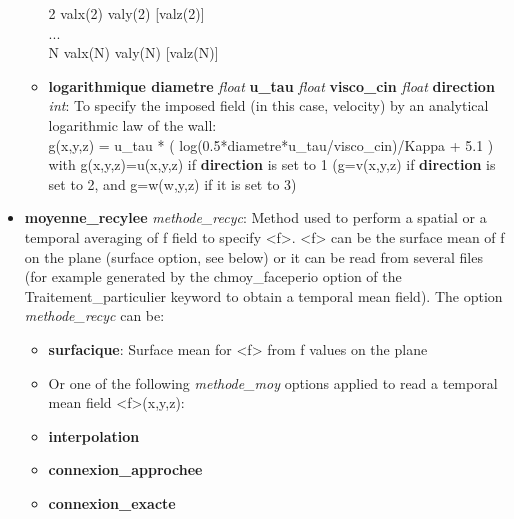 \begin{itemize}
\begin{itemize}
\begin{center}
    \hspace{-0.3cm} 2 valx(2) valy(2) [valz(2)] \\
    \hspace{-3.6cm} ... \\
    N valx(N) valy(N) [valz(N)] 
\end{center}
%
\item[] \textbf{logarithmique diametre} \textit{float} \textbf{u\_tau} \textit{float} \textbf{visco\_cin} \textit{float} \textbf{direction} \textit{int}: To specify the imposed field (in this case, velocity) by an analytical logarithmic law of the wall: \\
%
g(x,y,z) = u\_tau * ( log(0.5*diametre*u\_tau/visco\_cin)/Kappa + 5.1 ) \\
%
with g(x,y,z)=u(x,y,z) if \textbf{direction} is set to 1 (g=v(x,y,z) if \textbf{direction} is set to 2, and g=w(w,y,z) if it is set to 3)
%    
\end{itemize}
%
\item \textbf{moyenne\_recylee} \textit{methode\_recyc}: Method used to perform a spatial or a temporal averaging of f field to specify <f>. <f> can be the surface mean of f on the plane (surface option, see below) or it can be read from several files (for example generated by the chmoy\_faceperio option of the Traitement\_particulier keyword to obtain a temporal mean field). The option \textit{methode\_recyc} can be:
\begin{itemize}
\item[] \textbf{surfacique}: Surface mean for <f> from f values on the plane
\item[] Or one of the following \textit{methode\_moy} options applied to read a temporal mean field <f>(x,y,z): 
\item[] \textbf{interpolation} 
\item[] \textbf{connexion\_approchee} 
\item[] \textbf{connexion\_exacte}
\end{itemize}
\end{itemize}
~%